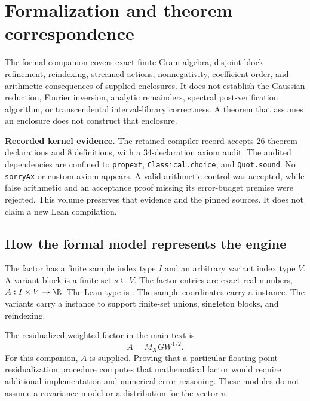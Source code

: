 \chapter{Formalization and theorem correspondence}\label{app:lean}
The formal companion covers exact finite Gram algebra, disjoint block
refinement, reindexing, streamed actions, nonnegativity, coefficient order,
and arithmetic consequences of supplied enclosures. It does not establish
the Gaussian reduction, Fourier inversion, analytic remainders, spectral
post-verification algorithm, or transcendental interval-library correctness.
A theorem that assumes an enclosure does not construct that enclosure.

\begin{scopebox}
\textbf{Recorded kernel evidence.} The retained compiler record accepts
26 theorem declarations and 8 definitions, with a 34-declaration axiom audit.
The audited dependencies are confined to \texttt{propext},
\texttt{Classical.choice}, and \texttt{Quot.sound}. No \texttt{sorryAx} or
custom axiom appears. A valid arithmetic control was accepted, while false
arithmetic and an acceptance proof missing its error-budget premise were
rejected. This volume preserves that evidence and the pinned sources. It
does not claim a new Lean compilation.
\end{scopebox}

\label{app:lean-contract}
\section{How the formal model represents the engine}

The factor has a finite sample index type $I$ and an arbitrary variant index
 type $V$. A variant block is a finite set $s\subseteq V$. The factor entries
are exact real numbers, $A:I\times V\to\R$. The Lean type is
. The sample coordinates carry a
 instance. The variants carry a  instance to
support finite-set unions, singleton blocks, and reindexing.

The residualized weighted factor in the main text is
\[
 A=M_X G W^{1/2}.
\]
For this companion, $A$ is supplied. Proving that a particular floating-point
residualization procedure computes that mathematical factor would require
additional implementation and numerical-error reasoning. These modules do
not assume a covariance model or a distribution for the vector $v$.

